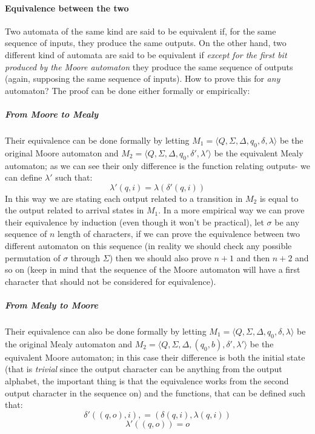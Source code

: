 \documentclass{scrartcl}
\begin{document}
    \paragraph{Equivalence between the two} Two automata of the same kind are said to be equivalent if, for the same sequence of inputs, they produce the same outputs. On the other hand, two different kind of automata are said to be equivalent if \emph{except for the first bit produced by the Moore automaton} they produce the same sequence of outputs (again, supposing the same sequence of inputs). How to prove this for \emph{any} automaton? The proof can be done either formally or empirically:
    \subparagraph{From Moore to Mealy} Their equivalence can be done formally by letting $M_1=\langle Q,\Sigma, \Delta, q_0, \delta, \lambda\rangle$ be the original Moore automaton and $M_2=\langle Q, \Sigma, \Delta, q_0, \delta', \lambda'\rangle$ be the equivalent Mealy automaton; as we can see their only difference is the function relating outputs- we can define $\lambda'$ such that:
    \begin{equation*}
        \lambda'(q,i)=\lambda(\delta'(q,i))
    \end{equation*}
    In this way we are stating each output related to a transition in $M_2$ is equal to the output related to arrival states in $M_1$.
    In a more empirical way we can prove their equivalence by induction (even though it won't be practical), let $\sigma$ be any sequence of $n$ length of characters, if we can prove the equivalence between two different automaton on this sequence (in reality we should check any possible permutation of $\sigma$ through $\Sigma$) then we should also prove $n+1$ and then $n+2$ and so on (keep in mind that the sequence of the Moore automaton will have a first character that should not be considered for equivalence).
    \subparagraph{From Mealy to Moore} Their equivalence can also be done formally by letting $M_1=\langle Q,\Sigma, \Delta, q_0, \delta, \lambda\rangle$ be the original Mealy automaton and $M_2=\langle Q, \Sigma, \Delta, (q_0,b), \delta', \lambda'\rangle$ be the equivalent Moore automaton; in this case their difference is both the initial state (that is \emph{trivial} since the output character can be anything from the output alphabet, the important thing is that the equivalence works from the second output character in the sequence on) and the functions, that can be defined such that:
    \begin{equation*}
        \delta'((q, o),i), = (\delta(q, i), \lambda(q, i))
    \end{equation*}
    \begin{equation*}
        \lambda'((q, o)) = o
    \end{equation*}
\end{document}
